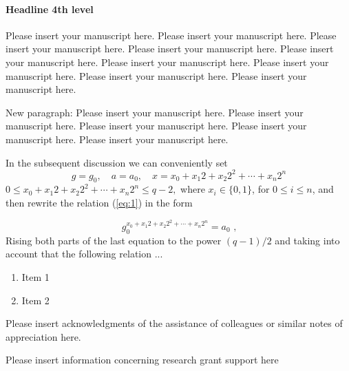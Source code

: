 \documentclass[USenglish,twocolumn]{article}
\begin{document}
\paragraph{Headline 4th level}
Please insert your manuscript here. Please insert your manuscript here. Please insert your manuscript here. Please insert your manuscript here. Please insert your manuscript here. Please insert your manuscript here. Please insert your manuscript here. Please insert your manuscript here. Please insert your manuscript here.

New paragraph: Please insert your manuscript here. Please insert your manuscript here. Please insert your manuscript here. Please insert your manuscript here. Please insert your manuscript here. 

In the subsequent discussion we can conveniently set
$$g=g_{0}, \quad a=a_{0}, \quad x=x_{0}+x_{1}2+x_{2}2^{2}+ \cdots +x_{n}2^{n}$$
$0 \leqslant x_{0}+x_{1}2+x_{2}2^{2}+ \cdots +x_{n}2^{n} \leqslant q-2,$
where $x_{i} \in \{0,1 \}$, for $0 \leqslant i \leqslant n$, and then
rewrite the relation (\ref{eq:1}) in the form

\begin{equation}\label{eq:1}
g_{0}^{x_{0}+x_{1}2+x_{2}2^{2}+ \cdots +x_{n}2^{n}}=a_{0} \mbox{ ,}
\end{equation}
Rising both parts of the last equation to the power $(q-1)/2$ and
taking into account that the following relation ...

\begin{enumerate}
\item Item 1
\item Item 2
\end{enumerate}

\begin{acknowledgement}
Please insert acknowledgments of the assistance of colleagues or similar notes of appreciation here.
\end{acknowledgement}

\def\acknowledgementname{Funding}
\begin{acknowledgement}
Please insert information concerning research grant support here
\end{acknowledgement}

%
%
\end{document}
